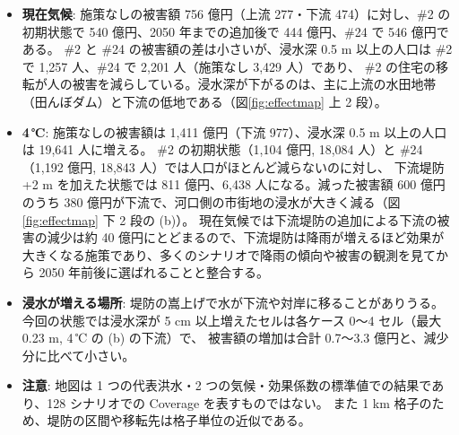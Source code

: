 \documentclass[a4paper,10pt]{ltjsarticle}
\begin{document}
\begin{itemize}
  \item \textbf{現在気候}: 施策なしの被害額 756 億円（上流 277・下流 474）に対し、\#2 の初期状態で 540 億円、2050 年までの追加後で 444 億円、\#24 で 546 億円である。
    \#2 と \#24 の被害額の差は小さいが、浸水深 0.5 m 以上の人口は \#2 で 1,257 人、\#24 で 2,201 人（施策なし 3,429 人）であり、
    \#2 の住宅の移転が人の被害を減らしている。浸水深が下がるのは、主に上流の水田地帯（田んぼダム）と下流の低地である（図\ref{fig:effectmap} 上 2 段）。
  \item \textbf{4\,℃}: 施策なしの被害額は 1,411 億円（下流 977）、浸水深 0.5 m 以上の人口は 19,641 人に増える。
    \#2 の初期状態（1,104 億円, 18,084 人）と \#24（1,192 億円, 18,843 人）では人口がほとんど減らないのに対し、
    下流堤防 +2 m を加えた状態では 811 億円、6,438 人になる。減った被害額 600 億円のうち 380 億円が下流で、河口側の市街地の浸水が大きく減る（図\ref{fig:effectmap} 下 2 段の (b)）。
    現在気候では下流堤防の追加による下流の被害の減少は約 40 億円にとどまるので、下流堤防は降雨が増えるほど効果が大きくなる施策であり、多くのシナリオで降雨の傾向や被害の観測を見てから 2050 年前後に選ばれることと整合する。
  \item \textbf{浸水が増える場所}: 堤防の嵩上げで水が下流や対岸に移ることがありうる。今回の状態では浸水深が 5 cm 以上増えたセルは各ケース 0〜4 セル（最大 0.23 m, 4\,℃ の (b) の下流）で、
    被害額の増加は合計 0.7〜3.3 億円と、減少分に比べて小さい。
  \item \textbf{注意}: 地図は 1 つの代表洪水・2 つの気候・効果係数の標準値での結果であり、128 シナリオでの Coverage を表すものではない。
    また 1 km 格子のため、堤防の区間や移転先は格子単位の近似である。
\end{itemize}
\end{document}
